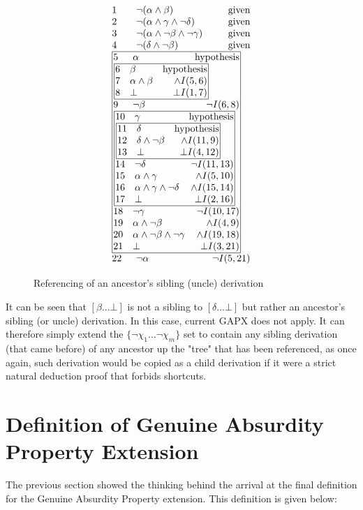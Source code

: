 \documentclass[11pt,twoside,a4paper]{report}
\begin{document}
\begin{figure}[thp]
\[\vbox{\offinterlineskip\halign{
&\tabskip=1.5em#\strut&$#$\hfil\tabskip=1em&\hfil$#$\tabskip=0em\cr
%
1&\neg(\alpha\wedge\beta)&\mbox{given}\cr
2&\neg(\alpha\wedge\gamma\wedge\neg\delta)&\mbox{given}\cr
3&\neg(\alpha\wedge\neg\beta\wedge\neg\gamma)&\mbox{given}\cr
4&\neg(\delta\wedge\neg\beta)&\mbox{given}\cr
%
\multispan3\vbox{\halign{
\vrule#&&\hskip.1em\tabskip=1em#\strut&$#$\hfil\tabskip=1em&\hfil$#$\hskip0.1em\tabskip=0em&\vrule#\cr
\noalign{\hrule}
%
&5&\alpha&\mbox{hypothesis}&\cr
%
&\multispan3\,\vbox{\halign{
\vrule#&&\hskip.1em\tabskip=1em#\strut&$#$\hfil\tabskip=1em&\hfil$#$\hskip0.1em\tabskip=0em&\vrule#\cr
\noalign{\hrule}
%
&6&\beta&\mbox{hypothesis}&\cr
&7&\alpha\wedge\beta&\wedge I(5,6)&\cr
&8&\bot&\bot I(1,7)&\cr
%
\noalign{\hrule}}}\,&\cr
%
&9&\neg\beta&\neg I(6,8)&\cr
%
&\multispan3\,\vbox{\halign{
\vrule#&&\hskip.1em\tabskip=1em#\strut&$#$\hfil\tabskip=1em&\hfil$#$\hskip0.1em\tabskip=0em&\vrule#\cr
\noalign{\hrule}
%
&10&\gamma&\mbox{hypothesis}&\cr
%
&\multispan3\,\vbox{\halign{
\vrule#&&\hskip.1em\tabskip=1em#\strut&$#$\hfil\tabskip=1em&\hfil$#$\hskip0.1em\tabskip=0em&\vrule#\cr
\noalign{\hrule}
%
&11&\delta&\mbox{hypothesis}&\cr
&12&\delta\wedge\neg\beta&\wedge I(11,9)&\cr
&13&\bot&\bot I(4,12)&\cr
%
\noalign{\hrule}}}\,&\cr
%
&14&\neg\delta&\neg I(11,13)&\cr
&15&\alpha\wedge\gamma&\wedge I(5,10)&\cr
&16&\alpha\wedge\gamma\wedge\neg\delta&\wedge I(15,14)&\cr
&17&\bot&\bot I(2,16)&\cr
%
\noalign{\hrule}}}\,&\cr
%
&18&\neg\gamma&\neg I(10,17)&\cr
&19&\alpha\wedge\neg\beta&\wedge I(4,9)&\cr
&20&\alpha\wedge\neg\beta\wedge\neg\gamma&\wedge I(19,18)&\cr
&21&\bot&\bot I(3,21)&\cr
%
\noalign{\hrule}}}\,\cr
%
22&\neg\alpha&\neg I(5,21)\cr
}}\]
\caption{Referencing of an ancestor's sibling (uncle) derivation\label{fig:gapxx}}
\end{figure}

It can be seen that $[\beta ... \bot]$ is not a sibling to $[\delta ... \bot]$ but rather an ancestor's sibling (or uncle) derivation. In this case, current GAPX does not apply. It can therefore simply extend the $\{\neg\chi_1 ... \neg\chi_m\}$ set to contain any sibling derivation (that came before) of any ancestor up the "tree" that has been referenced, as once again, such derivation would be copied as a child derivation if it were a strict natural deduction proof that forbids shortcuts.

\section{Definition of Genuine Absurdity Property Extension}
The previous section showed the thinking behind the arrival at the final definition for the Genuine Absurdity Property extension. This definition is given below:
\end{document}
